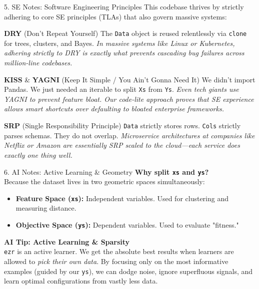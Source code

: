 \begin{frame}{5. SE Notes: Software Engineering Principles}
  \vspace{0.2cm}
  This codebase thrives by strictly adhering to core SE principles (TLAs) that also govern massive systems:

  \vspace{0.3cm}
  \begin{block}{\textbf{DRY} (Don't Repeat Yourself)}
  The \texttt{Data} object is reused relentlessly via \texttt{clone} for trees, clusters, and Bayes. \textit{In massive systems like Linux or Kubernetes, adhering strictly to DRY is exactly what prevents cascading bug failures across million-line codebases.}
  \end{block}

  \begin{block}{\textbf{KISS} \& \textbf{YAGNI} (Keep It Simple / You Ain't Gonna Need It)}
  We didn't import Pandas. We just needed an iterable to split \texttt{Xs} from \texttt{Ys}. \textit{Even tech giants use YAGNI to prevent feature bloat. Our code-lite approach proves that SE experience allows smart shortcuts over defaulting to bloated enterprise frameworks.}
  \end{block}

  \begin{block}{\textbf{SRP} (Single Responsibility Principle)}
  \texttt{Data} strictly stores rows. \texttt{Cols} strictly parses schemas. They do not overlap. \textit{Microservice architectures at companies like Netflix or Amazon are essentially SRP scaled to the cloud—each service does exactly one thing well.}
  \end{block}
\end{frame}

\begin{frame}{6. AI Notes: Active Learning \& Geometry}
  \vspace{0.3cm}
  \textbf{Why split \texttt{xs} and \texttt{ys}?} \\
  Because the dataset lives in two geometric spaces simultaneously:
  \begin{itemize}
      \item \textbf{Feature Space (\texttt{xs}):} Independent variables. Used for clustering and measuring distance.
      \item \textbf{Objective Space (\texttt{ys}):} Dependent variables. Used to evaluate "fitness."
  \end{itemize}

  \vspace{0.4cm}
  \textbf{AI Tip: Active Learning \& Sparsity} \\
  \texttt{ezr} is an active learner. We get the absolute best results when learners are allowed to \textit{pick their own data}. By focusing only on the most informative examples (guided by our \texttt{ys}), we can dodge noise, ignore superfluous signals, and learn optimal configurations from vastly less data.
\end{frame}


